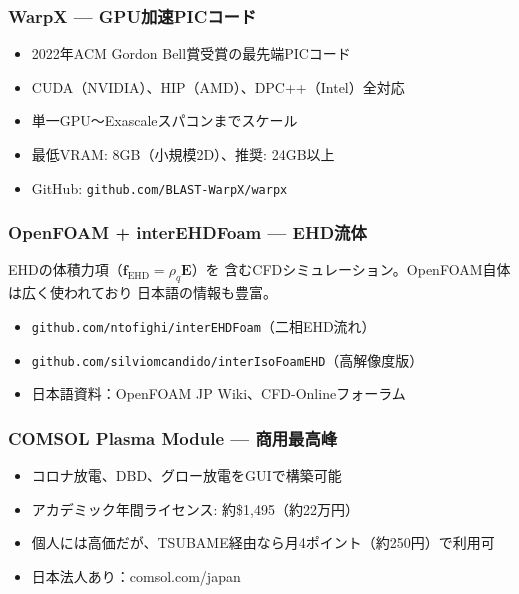 \documentclass[12pt,a4paper]{ltjsarticle}
\begin{document}
\subsubsection{WarpX --- GPU加速PICコード}

\begin{infobox}[粒子レベルのプラズマ物理を見たい場合]
\begin{itemize}[leftmargin=2em]
  \item 2022年ACM Gordon Bell賞受賞の最先端PICコード
  \item CUDA（NVIDIA）、HIP（AMD）、DPC++（Intel）全対応
  \item 単一GPU〜Exascaleスパコンまでスケール
  \item 最低VRAM: 8GB（小規模2D）、推奨: 24GB以上
  \item GitHub: \texttt{github.com/BLAST-WarpX/warpx}
\end{itemize}
\end{infobox}

\subsubsection{OpenFOAM + interEHDFoam --- EHD流体}

EHDの体積力項（$\mathbf{f}_{\mathrm{EHD}} = \rho_q \mathbf{E}$）を
含むCFDシミュレーション。OpenFOAM自体は広く使われており
日本語の情報も豊富。

\begin{itemize}[leftmargin=2em]
  \item \texttt{github.com/ntofighi/interEHDFoam}（二相EHD流れ）
  \item \texttt{github.com/silviomcandido/interIsoFoamEHD}（高解像度版）
  \item 日本語資料：OpenFOAM JP Wiki、CFD-Onlineフォーラム
\end{itemize}

\subsubsection{COMSOL Plasma Module --- 商用最高峰}

\begin{itemize}[leftmargin=2em]
  \item コロナ放電、DBD、グロー放電をGUIで構築可能
  \item アカデミック年間ライセンス: 約\$1,495（約22万円）
  \item 個人には高価だが、TSUBAME経由なら月4ポイント（約250円）で利用可
  \item 日本法人あり：comsol.com/japan
\end{itemize}
\end{document}
